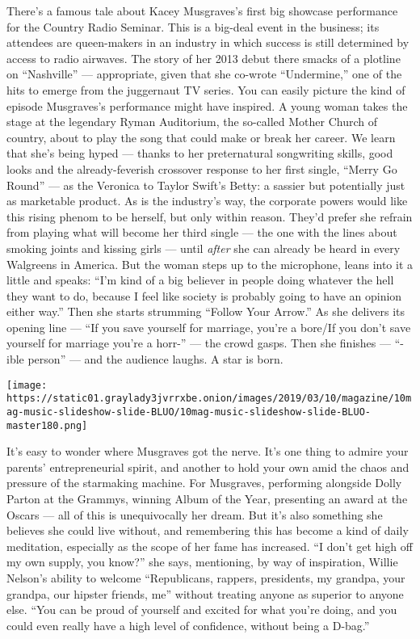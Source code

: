 There's a famous tale about Kacey Musgraves's first big showcase
performance for the Country Radio Seminar. This is a big-deal event in
the business; its attendees are queen-makers in an industry in which
success is still determined by access to radio airwaves. The story of
her 2013 debut there smacks of a plotline on ``Nashville'' ---
appropriate, given that she co-wrote ``Undermine,'' one of the hits to
emerge from the juggernaut TV series. You can easily picture the kind of
episode Musgraves's performance might have inspired. A young woman takes
the stage at the legendary Ryman Auditorium, the so-called Mother Church
of country, about to play the song that could make or break her career.
We learn that she's being hyped --- thanks to her preternatural
songwriting skills, good looks and the already-feverish crossover
response to her first single, ``Merry Go Round'' --- as the Veronica to
Taylor Swift's Betty: a sassier but potentially just as marketable
product. As is the industry's way, the corporate powers would like this
rising phenom to be herself, but only within reason. They'd prefer she
refrain from playing what will become her third single --- the one with
the lines about smoking joints and kissing girls --- until \emph{after}
she can already be heard in every Walgreens in America. But the woman
steps up to the microphone, leans into it a little and speaks: ``I'm
kind of a big believer in people doing whatever the hell they want to
do, because I feel like society is probably going to have an opinion
either way.'' Then she starts strumming ``Follow Your Arrow.'' As she
delivers its opening line --- ``If you save yourself for marriage,
you're a bore/If you don't save yourself for marriage you're a horr-''
--- the crowd gasps. Then she finishes --- ``-ible person'' --- and the
audience laughs. A star is born.

\texttt{[image: https://static01.graylady3jvrrxbe.onion/images/2019/03/10/magazine/10mag-music-slideshow-slide-BLUO/10mag-music-slideshow-slide-BLUO-master180.png]}

It's easy to wonder where Musgraves got the nerve. It's one thing to
admire your parents' entrepreneurial spirit, and another to hold your
own amid the chaos and pressure of the starmaking machine. For
Musgraves, performing alongside Dolly Parton at the Grammys, winning
Album of the Year, presenting an award at the Oscars --- all of this is
unequivocally her dream. But it's also something she believes she could
live without, and remembering this has become a kind of daily
meditation, especially as the scope of her fame has increased. ``I don't
get high off my own supply, you know?'' she says, mentioning, by way of
inspiration, Willie Nelson's ability to welcome ``Republicans, rappers,
presidents, my grandpa, your grandpa, our hipster friends, me'' without
treating anyone as superior to anyone else. ``You can be proud of
yourself and excited for what you're doing, and you could even really
have a high level of confidence, without being a D-bag.''

